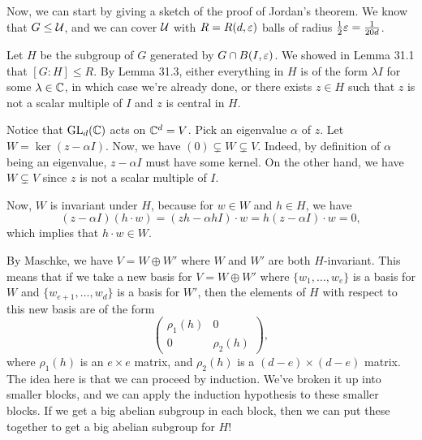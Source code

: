 Now, we can start by giving a sketch of the proof of Jordan's theorem. We know 
that $G \leq {\cal U}$, and we can cover ${\cal U}$ with $R = R(d, \varepsilon)$ balls
of radius $\frac12 \varepsilon = \frac{1}{20d}$. 

Let $H$ be the subgroup of $G$ generated by $G \cap B(I, \varepsilon)$. We showed in 
Lemma 31.1 that $[G : H] \leq R$. By Lemma 31.3, either everything in $H$ 
is of the form $\lambda I$ for some $\lambda \in \mathbb{C}$, in which case 
we're already done, or there exists $z \in H$ such that $z$ is not a 
scalar multiple of $I$ and $z$ is central in $H$. 

Notice that $\operatorname{GL}_d(\mathbb{C})$ acts on $\mathbb{C}^d = V$. Pick an eigenvalue $\alpha$ of $z$. 
Let $W = \ker(z - \alpha I)$. Now, we have $(0) \subsetneq W \subsetneq V$.
Indeed, by definition of $\alpha$ being an eigenvalue, $z - \alpha I$ must 
have some kernel. On the other hand, we have $W \subsetneq V$ since 
$z$ is not a scalar multiple of $I$. 

Now, $W$ is invariant under $H$, because for $w \in W$ and $h \in H$, we have 
\[ (z - \alpha I)(h \cdot w) = (zh - \alpha h I) \cdot w = h(z - \alpha I) 
\cdot w = 0, \] 
which implies that $h \cdot w \in W$. 

By Maschke, we have $V = W \oplus W'$ where $W$ and $W'$ are both $H$-invariant. 
This means that if we take a new basis for $V = W \oplus W'$ where 
$\{w_1, \dots, w_e\}$ is a basis for $W$ and $\{w_{e+1}, \dots, w_d\}$ is a 
basis for $W'$, then the elements of $H$ with respect to this new basis 
are of the form 
\[ \begin{pmatrix}
    \rho_1(h) & 0 \\ 
    0 & \rho_2(h)
\end{pmatrix}, \] 
where $\rho_1(h)$ is an $e\times e$ matrix, and $\rho_2(h)$ is a 
$(d-e)\times (d-e)$ matrix. The idea here is that we can proceed by 
induction. We've broken it up into smaller blocks, and we can apply the 
induction hypothesis to these smaller blocks. If we get a big abelian 
subgroup in each block, then we can put these together to get a big 
abelian subgroup for $H$!